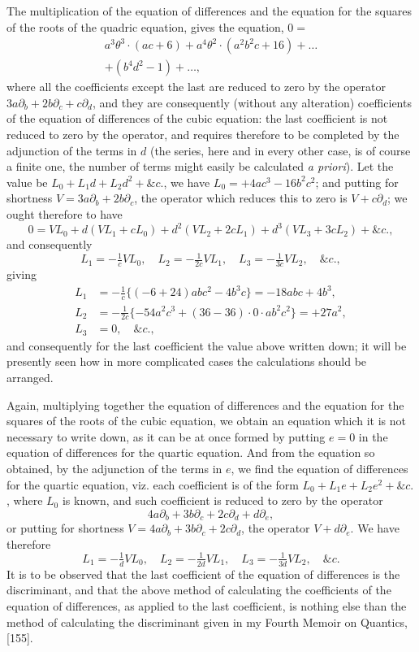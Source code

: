 \documentclass[11pt,a4paper]{article}
\theoremstyle{definition}
\begin{document}
The multiplication of the equation of differences and the equation for the squares of the roots of the quadric equation, gives the equation, $0=$
\begin{multline*}
a^3\theta^3\cdot(ac+6)+a^4\theta^2\cdot(a^2b^2c+16)+\ldots\\
+(b^4d^2-1)+\ldots,
\end{multline*}
where all the coefficients except the last are reduced to zero by the operator $3a\partial_b+2b\partial_c+c\partial_d$, and they are consequently (without any alteration) coefficients of the equation of differences of the cubic equation: the last coefficient is not reduced to zero by the operator, and requires therefore to be completed by the adjunction of the terms in $d$ (the series, here and in every other case, is of course a finite one, the number of terms might easily be calculated \textit{a priori}). Let the value be $L_0+L_1d+L_2d^2+\&c.$, we have $L_0=+4ac^3-16b^2c^2$; and putting for shortness $V=3a\partial_b+2b\partial_c$, the operator which reduces this to zero is $V+c\partial_d$; we ought therefore to have
\[
0=VL_0+d(VL_1+cL_0)+d^2(VL_2+2cL_1)+d^3(VL_3+3cL_2)+\&c.,
\]
and consequently
\[
L_1=-\tfrac{1}{c}VL_0,\quad L_2=-\tfrac{1}{2c}VL_1,\quad L_3=-\tfrac{1}{3c}VL_2,\quad \&c.,
\]
giving
\begin{align*}
L_1 &= -\tfrac{1}{c}\{(-6+24)abc^2-4b^3c\}=-18abc+4b^3,\\
L_2 &= -\tfrac{1}{2c}\{-54a^2c^3+(36-36)\cdot0\cdot a b^2c^2\}=+27a^2,\\
L_3 &= 0,\quad \&c.,
\end{align*}
and consequently for the last coefficient the value above written down; it will be presently seen how in more complicated cases the calculations should be arranged.

Again, multiplying together the equation of differences and the equation for the squares of the roots of the cubic equation, we obtain an equation which it is not necessary to write down, as it can be at once formed by putting $e=0$ in the equation of differences for the quartic equation. And from the equation so obtained, by the adjunction of the terms in $e$, we find the equation of differences for the quartic equation, viz. each coefficient is of the form $L_0+L_1e+L_2e^2+\&c.$, where $L_0$ is known, and such coefficient is reduced to zero by the operator
\[
4a\partial_b+3b\partial_c+2c\partial_d+d\partial_e,
\]
or putting for shortness $V=4a\partial_b+3b\partial_c+2c\partial_d$, the operator $V+d\partial_e$. We have therefore
\[
L_1=-\tfrac{1}{d}VL_0,\quad L_2=-\tfrac{1}{2d}VL_1,\quad L_3=-\tfrac{1}{3d}VL_2,\quad \&c.
\]
It is to be observed that the last coefficient of the equation of differences is the discriminant, and that the above method of calculating the coefficients of the equation of differences, as applied to the last coefficient, is nothing else than the method of calculating the discriminant given in my Fourth Memoir on Quantics, [155].
\end{document}
